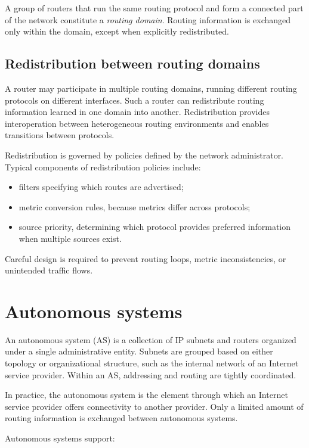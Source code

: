 \documentclass[11pt,a4paper,openany]{report}
\begin{document}
A group of routers that run the same routing protocol and form a connected part of the network constitute a \emph{routing domain}. Routing information is exchanged only within the domain, except when explicitly redistributed.

\subsection{Redistribution between routing domains}

A router may participate in multiple routing domains, running different routing protocols on different interfaces. Such a router can redistribute routing information learned in one domain into another. Redistribution provides interoperation between heterogeneous routing environments and enables transitions between protocols.

Redistribution is governed by policies defined by the network administrator. Typical components of redistribution policies include:

\begin{itemize}
\item filters specifying which routes are advertised;
\item metric conversion rules, because metrics differ across protocols;
\item source priority, determining which protocol provides preferred information when multiple sources exist.
\end{itemize}

Careful design is required to prevent routing loops, metric inconsistencies, or unintended traffic flows.

\section{Autonomous systems}

An autonomous system (AS) is a collection of IP subnets and routers organized under a single administrative entity. Subnets are grouped based on either topology or organizational structure, such as the internal network of an Internet service provider. Within an AS, addressing and routing are tightly coordinated.

In practice, the autonomous system is the element through which an Internet
service provider offers connectivity to another provider. Only a limited amount
of routing information is exchanged between autonomous systems.

Autonomous systems support:
\end{document}
